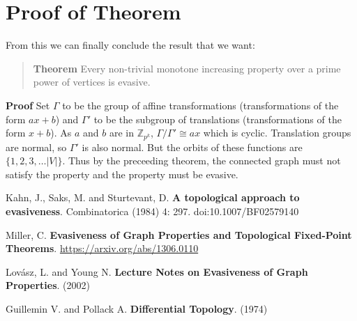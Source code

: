 \documentclass[a4paper]{article}
\begin{document}
\section{Proof of Theorem}

From this we can finally conclude the result that we want:

\begin{quote}
    \textbf{Theorem} Every non-trivial monotone increasing property over a prime power of vertices is evasive.
\end{quote}

\textbf{Proof} Set $\Gamma$ to be the group of affine transformations (transformations of the form $ax + b$) and $\Gamma'$ to be the subgroup of translations (transformations of the form $x + b$). As $a$ and $b$ are in $\mathbb{Z}_{p^k}$, $\Gamma/\Gamma' \cong ax$ which is cyclic. Translation groups are normal, so $\Gamma'$ is also normal. But the orbits of these functions are $\{ 1, 2, 3, \ldots |V| \}$. Thus by the preceeding theorem, the connected graph must not satisfy the property and the property must be evasive.

\begin{thebibliography}{10}
Kahn, J., Saks, M. and Sturtevant, D. \textbf{A topological approach to evasiveness}. Combinatorica (1984) 4: 297. doi:10.1007/BF02579140

Miller, C. \textbf{ Evasiveness of Graph Properties and Topological Fixed-Point Theorems}. \url{https://arxiv.org/abs/1306.0110}

Lovász, L. and Young N. \textbf{Lecture Notes on Evasiveness of Graph Properties}. (2002)

Guillemin V. and Pollack A. \textbf{Differential Topology}. (1974)

\end{thebibliography}
\end{document}
